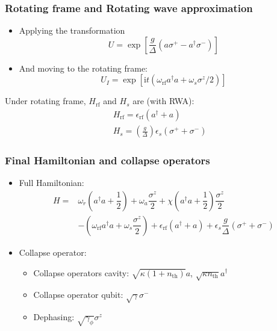 \documentclass[xcolor=dvipsnames,hyperref={CJKbookmarks=true}]{beamer}
\newcommand\mi{\mathrm{i}}
\newcommand{\rf}{\text{rf}}
\newcommand{\thm}{\text{th}}
\begin{document}
\begin{frame}
\frametitle{Rotating frame and Rotating wave approximation}
\begin{itemize}
\item Applying the transformation
$$U=\exp\left[\dfrac{g}{\Delta}\left(a\sigma^{+}-a^{\dagger}\sigma^{-} \right)\right]$$
\item And moving to the rotating frame:
$$U_I=\exp\left[\mi t\left(
\omega_{\rf}a^{\dagger}a +\omega_s\sigma^{z}/2 \right)\right]$$
\end{itemize}
Under rotating frame, $H_{\rf}$ and $H_{s}$ are (with RWA):
\begin{align*}
	&H_{\rf} = \epsilon_{\rf}\left(a^{\dagger}+a\right) \\
	&H_{s} = \left(\frac{g}{\Delta}\right)\epsilon_{s}\left(\sigma^{+}+\sigma^{-} \right)
\end{align*}
\end{frame}

\begin{frame}
\frametitle{Final Hamiltonian and collapse operators}
\begin{itemize}
	\item Full Hamiltonian: 
\begin{align*}
H =& \omega_r \left(a^{\dagger} a+ \dfrac{1}{2} \right) +  \omega_a \dfrac{\sigma^{z}}{2}+ \chi \left(a^{\dagger}a+\dfrac{1}{2} \right)\dfrac{\sigma^{z}}{2}\\
& - \left( \omega_{\rf}a^{\dagger}a +\omega_s \dfrac{\sigma^{z}}{2} \right) + \epsilon_{\rf}\left(a^{\dagger}+a\right) 
+  \epsilon_{s}\dfrac{g}{\Delta}\left(\sigma^{+}+\sigma^{-} \right)
\end{align*}
	\item Collapse operator: 
	\begin{itemize}
		\item  Collapse operators cavity: 
		$\sqrt{\kappa \left(1+n_{\thm} \right)}a$, 
		$\sqrt{\kappa n_{\thm} }a^{\dagger}$
		\item Collapse operator qubit:  
		$\sqrt{\gamma}\sigma^{-}$
		\item Dephasing: 
		$\sqrt{\gamma_{\phi}}\sigma^{z}$
	\end{itemize}
\end{itemize}
\end{frame}

\end{document}
